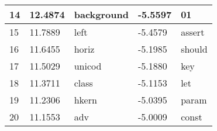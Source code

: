 \begin{table}[h]
\begin{tabular}{|l|l|l|l|l|}
14 & 12.4874  &        background  &  -5.5597  &               01 \\  \hline
15 & 11.7889  &              left  &  -5.4579  &           assert \\  \hline
16 & 11.6455  &             horiz  &  -5.1985  &           should \\  \hline
17 & 11.5029  &            unicod  &  -5.1880  &              key \\  \hline
18 & 11.3711  &             class  &  -5.1153  &              let \\  \hline
19 & 11.2306  &             hkern  &  -5.0395  &            param \\  \hline
20 & 11.1553  &               adv  &  -5.0009  &            const \\  \hline
\end{tabular}
\end{table}